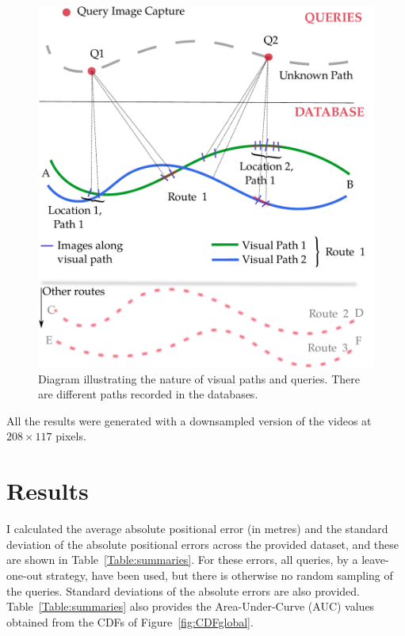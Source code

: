 \begin{figure}
\centering
\includegraphics[width=\linewidth]{./gfx/Chapter04/pathexample.pdf}
\caption{Diagram illustrating the nature of visual paths and queries.  There are different paths recorded in the databases.}
\label{fig:pathexample}
\end{figure}
  

All the results were generated with a downsampled version of the videos at $208 \times 117$ pixels. 




\section{Results}
\label{sec:ch4results}

I calculated the average absolute positional error (in metres) and the standard deviation of the absolute positional errors across the provided dataset, and these are shown in Table~\ref{Table:summaries}. For these errors, all queries, by a leave-one-out strategy, have been used, but there is otherwise no random sampling of the queries.  Standard deviations of the absolute errors are also provided.  Table~\ref{Table:summaries} also provides the Area-Under-Curve (AUC) values obtained from the CDFs of Figure~\ref{fig:CDFglobal}.


